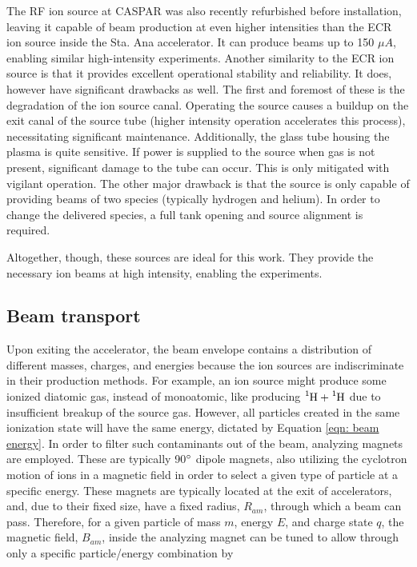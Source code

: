 The RF ion source at CASPAR was also recently refurbished before installation, leaving it capable of beam production at even higher intensities than the ECR ion source inside the Sta. Ana accelerator. It can produce beams up to 150 $\mu A$, enabling similar high-intensity experiments. Another similarity to the ECR ion source is that it provides excellent operational stability and reliability. It does, however have significant drawbacks as well. The first and foremost of these is the degradation of the ion source canal. Operating the source causes a buildup on the exit canal of the source tube (higher intensity operation accelerates this process), necessitating significant maintenance. Additionally, the glass tube housing the plasma is quite sensitive. If power is supplied to the source when gas is not present, significant damage to the tube can occur. This is only mitigated with vigilant operation. The other major drawback is that the source is only capable of providing beams of two species (typically hydrogen and helium). In order to change the delivered species, a full tank opening and source alignment is required. 

Altogether, though, these sources are ideal for this work. They provide the necessary ion beams at high intensity, enabling the experiments. 




\subsection{Beam transport}
\label{sec: beamline}


Upon exiting the accelerator, the beam envelope contains a distribution of different masses, charges, and energies because the ion sources are indiscriminate in their production methods. For example, an ion source might produce some ionized diatomic gas, instead of monoatomic, like producing $\ce{^{1}H}+\ce{^{1}H}$ due to insufficient breakup of the source gas. However, all particles created in the same ionization state will have the same energy, dictated by Equation \ref{eqn: beam energy}. In order to filter such contaminants out of the beam, analyzing magnets are employed. These are typically 90$\degree$ dipole magnets, also utilizing the cyclotron motion of ions in a magnetic field in order to select a given type of particle at a specific energy. These magnets are typically located at the exit of accelerators, and, due to their fixed size, have a fixed radius, $R_{am}$, through which a beam can pass. Therefore, for a given particle of mass $m$, energy $E$, and charge state $q$, the magnetic field, $B_{am}$, inside the analyzing magnet can be tuned to allow through only a specific particle/energy combination by

